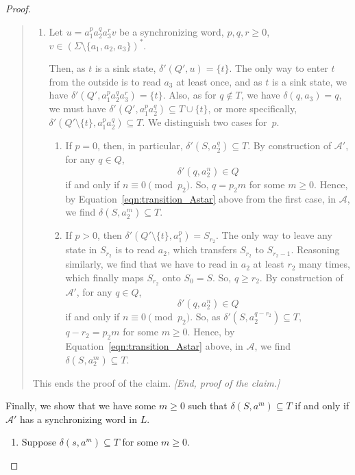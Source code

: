 \begin{proof}
\begin{quote}
\begin{enumerate}
\item Let $u = a_1^{p} a_2^q a_3^r v$ be a synchronizing word, $p,q,r \ge 0$, $v \in (\Sigma\setminus \{a_1,a_2,a_3\})^*$.

 \medskip

 Then, as $t$ is a sink state, $\delta'(Q', u) = \{t\}$.
 The only way to enter $t$ from the outside is to read $a_3$ at least once, and 
 as $t$ is a sink state, we have $\delta'(Q', a_1^p a_2^q a_3^r) = \{t\}$.
 Also, as for $q \notin T$, we have $\delta(q, a_3) = q$,
 we must have $\delta'(Q', a_1^p a_2^q) \subseteq T \cup \{t\}$,
 or more specifically, $\delta'(Q' \setminus \{t\}, a_1^p a_2^q) \subseteq T$.
 We distinguish two cases for~$p$.
 
 \begin{enumerate}
 \item If $p = 0$, then, in particular, $\delta'(S, a_2^q)  \subseteq T$.
     By construction of $\mathcal A'$, for any $q \in Q$,
 \[
  \delta'(q, a_2^n) \in Q
 \]
 if and only if $n \equiv 0\pmod{p_2}$.
 So, $q = p_2 m$ for some $m \ge 0$.
 Hence, by Equation~\eqref{eqn:transition_Astar} above from the first case, in $\mathcal A$,
 we find $\delta(S, a_2^m) \subseteq T$.
 
 \item  If $p > 0$, then $\delta'(Q' \setminus\{t\}, a_1^p) = S_{r_2}$.
 The only way to leave any state in $S_{r_2}$
 is to read $a_2$, which transfers $S_{r_2}$ to $S_{r_2-1}$.
 Reasoning similarly, we find that we have to read in $a_2$
 at least $r_2$ many times, which finally maps $S_{r_2}$
 onto $S_0 = S$. So, $q \ge r_2$. By construction of $\mathcal A'$, for any $q \in Q$,
 \[
  \delta'(q, a_2^n) \in Q
 \]
 if and only if $n \equiv 0\pmod{p_2}$.
 So, as $\delta'(S, a_2^{q - r_2}) \subseteq T$, $q - r_2 = p_2 m$ for some $m \ge 0$.
 Hence, by Equation~\eqref{eqn:transition_Astar} above, in $\mathcal A$,
 we find $\delta(S, a_2^m) \subseteq T$.
 \end{enumerate}
 
 

\end{enumerate}
This ends the proof of the claim. \emph{[End, proof of the claim.]}
\end{quote}

Finally, we show that we have some $m \ge 0$
such that $\delta(S, a^m) \subseteq T$
if and only if $\mathcal A'$ has a synchronizing word in $L$.

\begin{enumerate}
\item Suppose $\delta(s, a^m) \subseteq T$ for some $m \ge 0$.


\end{enumerate}
\end{proof}
